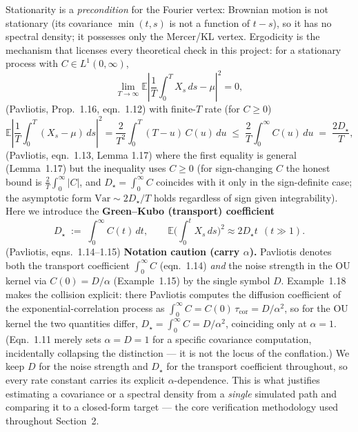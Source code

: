 \documentclass[11pt]{article}
\newcommand{\pav}[1]{{\small\color{hubblue}(Pavliotis, #1)}}
\newcommand{\Dstar}{D_{\star}}
\begin{document}
Stationarity is a \emph{precondition} for the Fourier vertex: Brownian motion is not stationary (its covariance $\min(t,s)$ is not a function of $t-s$), so it has no spectral density; it possesses only the Mercer/KL vertex. Ergodicity is the mechanism that licenses every theoretical check in this project: for a stationary process with $C\in L^1(0,\infty)$,
\begin{equation}
\lim_{T\to\infty}\mathbb{E}\left|\frac{1}{T}\int_0^T X_s\,ds - \mu\right|^2 = 0,
\label{eq:ergodic}
\end{equation}
\pav{Prop.~1.16, eqn.~1.12} with finite-$T$ rate (for $C\geq 0$)
\begin{equation}
\mathbb{E}\left|\frac{1}{T}\int_0^T (X_s-\mu)\,ds\right|^2 = \frac{2}{T^2}\int_0^T (T-u)\,C(u)\,du \;\leq\; \frac{2}{T}\int_0^\infty C(u)\,du \;=\; \frac{2\Dstar}{T},
\label{eq:ergodic-rate}
\end{equation}
\pav{eqn.~1.13, Lemma 1.17} where the first equality is general (Lemma~1.17) but the inequality uses $C\geq0$ (for sign-changing $C$ the honest bound is $\tfrac{2}{T}\int_0^\infty|C|$, and $\Dstar=\int_0^\infty C$ coincides with it only in the sign-definite case; the asymptotic form $\mathrm{Var}\sim 2\Dstar/T$ holds regardless of sign given integrability). Here we introduce the \textbf{Green--Kubo (transport) coefficient}
\begin{equation}
\Dstar \;:=\; \int_0^\infty C(t)\,dt,
\qquad
\mathbb{E}\Big(\int_0^t X_s\,ds\Big)^2 \approx 2\Dstar t \ \ (t \gg 1).
\label{eq:greenkubo}
\end{equation}
\pav{eqns.~1.14--1.15} \textbf{Notation caution (carry $\alpha$).} Pavliotis denotes both the transport coefficient $\int_0^\infty C$ (eqn.~1.14) \emph{and} the noise strength in the OU kernel via $C(0)=D/\alpha$ (Example~1.15) by the single symbol $D$. Example~1.18 makes the collision explicit: there Pavliotis computes the diffusion coefficient of the exponential-correlation process as $\int_0^\infty C = C(0)\,\tau_{\mathrm{cor}} = D/\alpha^2$, so for the OU kernel the two quantities differ, $\Dstar = \int_0^\infty C = D/\alpha^2$, coinciding only at $\alpha=1$. (Eqn.~1.11 merely sets $\alpha=D=1$ for a specific covariance computation, incidentally collapsing the distinction --- it is not the locus of the conflation.) We keep $D$ for the noise strength and $\Dstar$ for the transport coefficient throughout, so every rate constant carries its explicit $\alpha$-dependence. This is what justifies estimating a covariance or a spectral density from a \emph{single} simulated path and comparing it to a closed-form target --- the core verification methodology used throughout Section~2.
\end{document}
